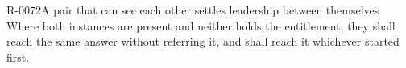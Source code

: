 \begin{requirement}{R-0072}{A pair that can see each other settles leadership between themselves}
  Where both instances are present and neither holds the entitlement, they shall
  reach the same answer without referring it, and shall reach it whichever
  started first.
\end{requirement}

